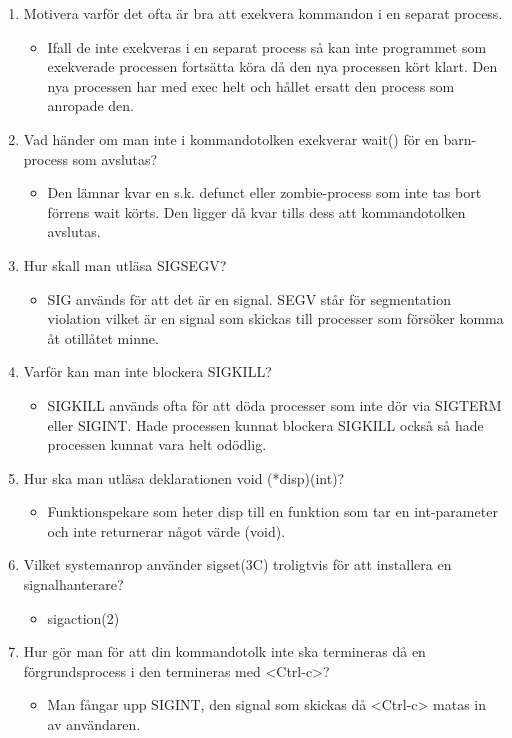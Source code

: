 \documentclass[a4paper,11pt]{article}
\begin{document}
\begin{enumerate}
	\item Motivera varför det ofta är bra att exekvera kommandon i en separat process.
	\begin{itemize}
		\item Ifall de inte exekveras i en separat process så kan inte programmet som exekverade processen fortsätta köra då den nya processen kört klart. Den nya processen har med exec helt och hållet ersatt den process som anropade den.
	\end{itemize}
	\item Vad händer om man inte i kommandotolken exekverar wait() för en barn-process som avslutas?
	\begin{itemize}
		\item Den lämnar kvar en s.k. defunct eller zombie-process som inte tas bort förrens wait körts. Den ligger då kvar tills dess att kommandotolken avslutas.
	\end{itemize}
	\item Hur skall man utläsa SIGSEGV?
	\begin{itemize}
		\item SIG används för att det är en signal. SEGV står för segmentation violation vilket är en signal som skickas till processer som försöker komma åt otillåtet minne.
	\end{itemize}
	\item Varför kan man inte blockera SIGKILL?
	\begin{itemize}
		\item SIGKILL används ofta för att döda processer som inte dör via SIGTERM eller SIGINT. Hade processen kunnat blockera SIGKILL också så hade processen kunnat vara helt odödlig.
	\end{itemize}
	\item Hur ska man utläsa deklarationen void (*disp)(int)?
	\begin{itemize}
		\item Funktionspekare som heter disp till en funktion som tar en int-parameter och inte returnerar något värde (void).
	\end{itemize}
	\item Vilket systemanrop använder sigset(3C) troligtvis för att installera en signalhanterare?
	\begin{itemize}
		\item sigaction(2)
	\end{itemize}
	\item Hur gör man för att din kommandotolk inte ska termineras då en förgrundsprocess i den termineras med <Ctrl-c>?
	\begin{itemize}
		\item Man fångar upp SIGINT, den signal som skickas då <Ctrl-c> matas in av användaren.
	\end{itemize}
\end{enumerate}
\end{document}
